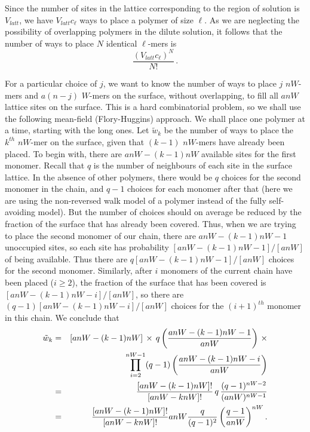 \documentclass[12pt]{article}
\begin{document}
Since the number of sites in the lattice corresponding to the region of solution is $V_{latt}$, 
we have $V_{latt}c_{\ell}$ ways to place a polymer of size ${\ell}$.  As we are neglecting the
possibility of overlapping polymers in the dilute solution, it follows that the number of ways to 
place $N$ identical $\ell$-mers is 
\begin{equation}
  \label{eq.Npoly}
   \frac{(V_{latt}c_{\ell})^N}{N!}  \,.   
\end{equation}

\smallskip

For a particular choice of $j$, we want to know the number of ways to place $j$ $nW$-mers 
and $a(n-j)$ $W$-mers on the surface, without overlapping, to fill all $anW$ lattice sites on the surface.
This is a hard combinatorial problem, so we shall use the following mean-field (Flory-Huggins) approach.
We shall place one polymer at a time, starting with the long ones.
Let $\tilde{w}_k$ be the number of ways to place the $k^{th}$ $nW$-mer on the surface, given that
$(k-1)$ $nW$-mers have already been placed.  
To begin with, there are $anW-(k-1)nW$ available sites for the first monomer.  Recall that  $q$ is the number of
neighbours of each site in the surface lattice.
In the absence of other polymers, there would be $q$ choices for the second monomer in the chain,
and $q-1$ choices for each monomer after that (here we are using the non-reversed walk model of a polymer
instead of the fully self-avoiding model).  But the number of choices should on average be reduced 
by the fraction of the surface that has already been covered.  
Thus, when we are trying to place the second monomer of our chain, there are
$anW-(k-1)nW-1$ unoccupied sites, so each site has 
probability $[anW-(k-1)nW-1]/[anW]$ of being available.  
Thus there are $q[anW-(k-1)nW-1]/[anW]$ choices for the second monomer.  
Similarly, after $i$ monomers of the current chain have been placed ($i\geq 2$), the fraction of the
surface that has been covered is $[anW-(k-1)nW-i]/[anW]$, so there are 
$(q-1)[anW-(k-1)nW-i]/[anW]$ choices for the $(i+1)^{th}$ monomer in this chain.  
We conclude that 
\begin{eqnarray}
   \tilde{w}_k  & = &   [anW-(k-1)nW]\,\times \,q\left(\frac{ anW-(k-1)nW-1}{anW}\right)    \,\times
   \nonumber    \\
   & &    \hspace{22mm}
     \prod_{i=2}^{nW-1}(q-1)\left(\frac{ anW-(k-1)nW-i}{anW}\right)  
      \nonumber \\
 & = &    \frac{[anW-(k-1)nW]!}{[anW-knW]!} \,q\,  \frac{(q-1)^{nW-2}}{(anW)^{nW-1}}  
     \nonumber    \\
     & = &    \frac{[anW-(k-1)nW]!}{[anW-knW]!}   anW \frac{q}{(q-1)^2}\left(  \frac{q-1}{anW}\right)^{nW}.
     \label{eq.wk2}
\end{eqnarray}
\end{document}

